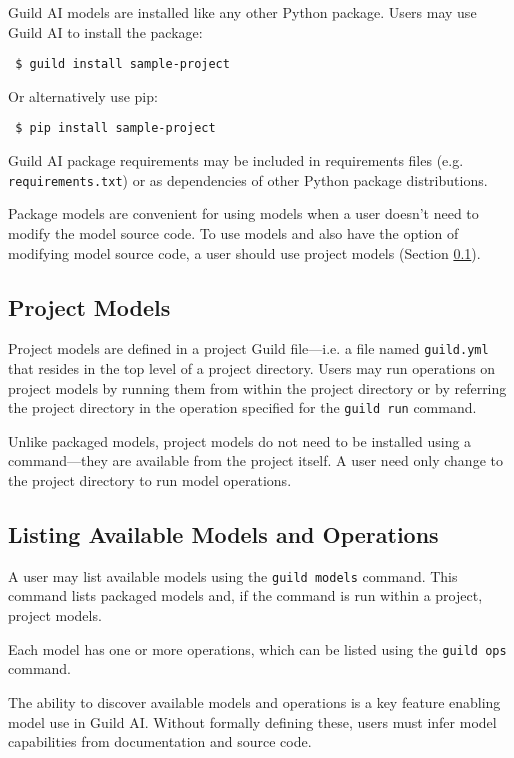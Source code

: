\documentclass{article}
\begin{document}
Guild AI models are installed like any other Python package. Users may
use Guild AI to install the package:

{\footnotesize
\begin{verbatim}
 $ guild install sample-project
\end{verbatim}}

Or alternatively use pip:

{\footnotesize
\begin{verbatim}
 $ pip install sample-project
\end{verbatim}}

Guild AI package requirements may be included in requirements files
(e.g. \verb|requirements.txt|) or as dependencies of other Python
package distributions.

Package models are convenient for using models when a user doesn't
need to modify the model source code. To use models and also have the
option of modifying model source code, a user should use project
models (Section \ref{sec:project-models}).

\subsection{Project Models}
\label{sec:project-models}

Project models are defined in a project Guild file---i.e. a file named
\verb|guild.yml| that resides in the top level of a project
directory. Users may run operations on project models by running them
from within the project directory or by referring the project
directory in the operation specified for the \verb|guild run| command.

Unlike packaged models, project models do not need to be installed
using a command---they are available from the project itself. A user
need only change to the project directory to run model operations.

\subsection{Listing Available Models and Operations}

A user may list available models using the \verb|guild models|
command. This command lists packaged models and, if the command is run
within a project, project models.

Each model has one or more operations, which can be listed using the
\verb|guild ops| command.

The ability to discover available models and operations is a key
feature enabling model use in Guild AI. Without formally defining
these, users must infer model capabilities from documentation and
source code.
\end{document}
